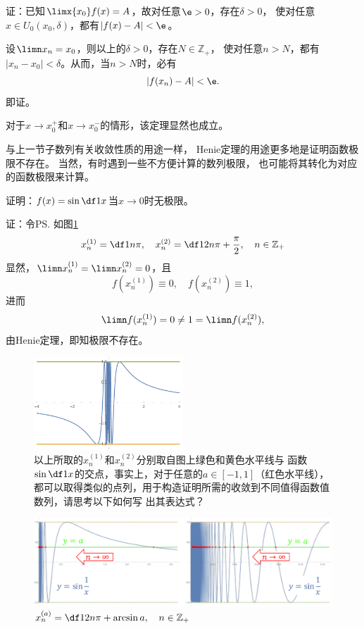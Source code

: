 证：已知$\limx{x_0}f(x)=A$，故对任意$\e>0$，存在$\delta>0$，
使对任意$x\in U_0(x_0,\delta)$，都有$|f(x)-A|<\e$。

设$\limn x_n=x_0$，则以上的$\delta>0$，存在$N\in\mathbb{Z}_+$，
使对任意$n>N$，都有$|x_n-x_0|<\delta$。从而，当$n>N$时，必有
$$|f(x_n)-A|<\e.$$
即证。\fin

对于$x\to x_0^+$和$x\to x_0^-$的情形，该定理显然也成立。

与上一节子数列有关收敛性质的用途一样，
Henie定理的用途更多地是证明函数极限不存在。
当然，有时遇到一些不方便计算的数列极限，
也可能将其转化为对应的函数极限来计算。

\bs
\egz 证明：$f(x)=\sin\df 1x$当$x\to 0$时无极限。

证：令\ps{如图\ref{fig:sin1x1-1}}
$$x^{(1)}_n=\df1{n\pi},\quad
x^{(2)}_n=\df1{2n\pi+\frac{\pi}2},\quad n\in\mathbb{Z}_+$$ 
显然，$\limn x^{(1)}_n=\limn x^{(2)}_n=0$，且
$$f(x^{(1)}_n)\equiv0,\quad f(x^{(2)}_n)\equiv1,$$
进而
$$\limn f(x^{(1)}_n)=0\ne1=\limn f(x^{(2)}_n),$$
由Henie定理，即知极限不存在。\fin

\begin{figure}[h]
	\centering
	\includegraphics[width=0.5\textwidth]{./Images/Ch01/sin1x.pdf}
	\caption{以上所取的$x^{(1)}_n$和$x^{(2)}_n$分别取自图上绿色和黄色水平线与
	函数$\sin\df1x$的交点，事实上，对于任意的$a\in[-1,1]$（红色水平线），
	都可以取得类似的点列，用于构造证明所需的收敛到不同值得函数值数列，请思考以下如何写
	出其表达式？}
	\label{fig:sin1x1-1}
\end{figure}

\begin{figure}[htbp]
	\centering
	\includegraphics[width=\textwidth]{./Images/Ch01/sin1xa.pdf}
	\caption{$x^{(a)}_n=\df1{2n\pi+\arcsin a},\quad n\in\mathbb{Z}_+$}
	\label{fig:sin1xa}
\end{figure}

